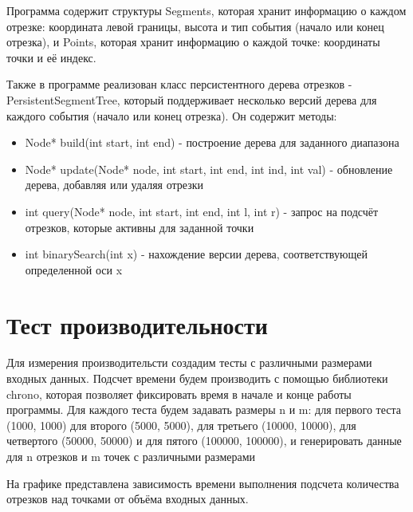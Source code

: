 \documentclass[12pt]{article}
\begin{document}
Программа содержит структуры Segments, которая хранит информацию о каждом отрезке: координата левой границы, высота и тип события (начало или конец отрезка), и Points, которая хранит информацию о каждой точке: координаты точки и её индекс.

Также в программе реализован класс персистентного дерева отрезков - PersistentSegmentTree, который поддерживает несколько версий дерева  для каждого события (начало или конец отрезка). Он содержит методы:
\begin{itemize}
    \item Node* build(int start, int end) - построение дерева для заданного диапазона
    \item Node* update(Node* node, int start, int end, int ind, int val) - обновление дерева, добавляя или удаляя отрезки
    \item int query(Node* node, int start, int end, int l, int r) - запрос на подсчёт отрезков, которые активны для заданной точки
    \item int binarySearch(int x) - нахождение версии дерева, соответствующей определенной оси x 
\end{itemize}

\newpage
\section*{Тест производительности}

Для измерения производительсти создадим тесты с различными размерами входных данных. Подсчет времени будем производить с помощью библиотеки chrono, которая позволяет фиксировать время в начале и конце работы программы. Для каждого теста будем задавать размеры n и m: для первого теста (1000, 1000) для второго (5000, 5000), для третьего (10000, 10000), для четвертого (50000, 50000) и для пятого (100000, 100000), и генерировать данные для n отрезков и m точек с различными размерами

На графике представлена зависимость времени выполнения подсчета количества отрезков над точками от объёма входных данных.

\begin{figure}[htbp]
    \centering
    \label{fig:graph}
\end{figure}
\end{document}

